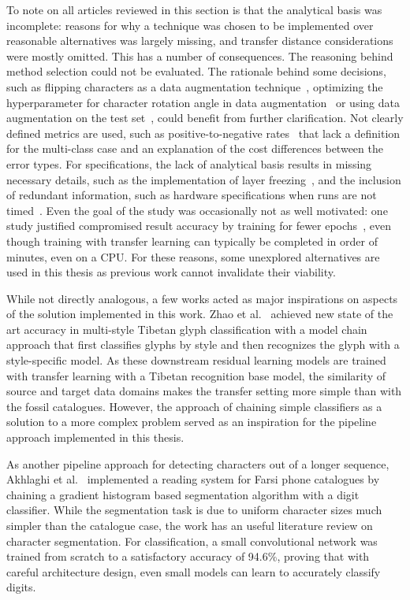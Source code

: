 \documentclass[english,twoside,openright]{UH_DS_MSc}
\begin{document}
To note on all articles reviewed in this section is that the analytical basis was incomplete: reasons for why a technique 
was chosen to be implemented over reasonable alternatives was largely missing, and transfer distance considerations were 
mostly omitted. This has a number of consequences. The reasoning behind method selection could not be evaluated. The rationale 
behind some decisions, such as flipping characters as a data augmentation technique~\cite{9thuonPalm}, optimizing the hyperparameter for character
 rotation angle in data augmentation~\cite{7rizkybasicCnnTransfer} or using data augmentation on the test set~\cite{11zunairUnconventionalWisdom}, could benefit from 
 further clarification. Not clearly defined metrics are used, such as positive-to-negative rates~\cite{10goelGujarati, 5rasheedHandwrittenUrduWAlexNet} that lack a definition for 
 the multi-class case and an explanation of the cost differences between the error types. For specifications, the lack of analytical
  basis results in missing necessary details, such as the implementation of layer freezing~\cite{8goelGujarati2023}, and the inclusion of redundant information,
   such as hardware specifications when runs are not timed~\cite{9thuonPalm}. Even the goal of the study was occasionally not as well motivated: one 
   study justified compromised result accuracy by training for fewer epochs~\cite{3chatterjeeBengali}, even though training with transfer learning can typically 
   be completed in order of minutes, even on a CPU. For these reasons, some unexplored alternatives are used in this
    thesis as previous work cannot invalidate their viability.

While not directly analogous, a few works acted as major inspirations on aspects of the solution implemented in this work.
Zhao et al.~\cite{4zhaoTibetan} achieved new state of the art accuracy in multi-style Tibetan glyph classification
with a model chain approach that first classifies glyphs by style and then recognizes the glyph with a style-specific model. As these downstream
 residual learning models are trained with transfer learning with a Tibetan 
 recognition base model, the similarity of source and target data domains makes the transfer setting more simple than with
the fossil catalogues. However, the approach of 
  chaining simple classifiers as a solution to a more complex problem served as an inspiration for
   the pipeline approach implemented in this thesis.

As another pipeline approach for detecting characters out of a longer sequence, Akhlaghi et al.~\cite{1akhlaghiFarsi} implemented 
a reading system for Farsi phone catalogues by chaining a gradient histogram based segmentation 
algorithm with a digit classifier. While the segmentation task is due to uniform character
 sizes much simpler than the catalogue case, the work has an useful literature review on
  character segmentation. For classification, a small convolutional network was trained
   from scratch to a satisfactory accuracy of 94.6\%, proving that with careful architecture design,
    even small models can learn to accurately classify digits.
\end{document}
